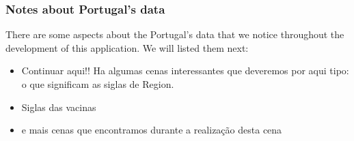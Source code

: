 \subsubsection{Notes about Portugal's data}

There are some aspects about the Portugal's data that we notice throughout the development of this application. We will listed them next:
\begin{itemize}
    \item Continuar aqui!! Ha algumas cenas interessantes que deveremos por aqui tipo:
    o que significam as siglas de Region.
    \item Siglas das vacinas
    \item e mais cenas que encontramos durante a realização desta cena
\end{itemize}